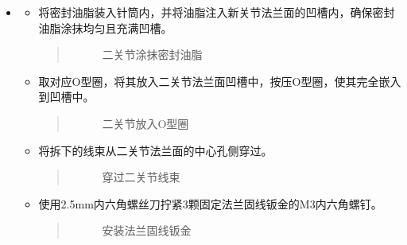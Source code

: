 \documentclass[a4paper,11pt,english,openany,oneside]{sphinxmanual}
\begin{document}
\begin{itemize}
\item {} 
\sphinxAtStartPar
{}
\begin{itemize}
\item {} 
\sphinxAtStartPar
将密封油脂装入针筒内，并将油脂注入新关节法兰面的凹槽内，确保密封油脂涂抹均匀且充满凹槽。
\begin{quote}

\begin{figure}[H]
\centering
\capstart

\noindent{}
\caption{二关节涂抹密封油脂}\label{\detokenize{_u66f4_u6362_u5173_u8282:id43}}\end{figure}
\end{quote}

\item {} 
\sphinxAtStartPar
取对应O型圈，将其放入二关节法兰面凹槽中，按压O型圈，使其完全嵌入到凹槽中。
\begin{quote}

\begin{figure}[H]
\centering
\capstart

\noindent{}
\caption{二关节放入O型圈}\label{\detokenize{_u66f4_u6362_u5173_u8282:id44}}\end{figure}
\end{quote}

\item {} 
\sphinxAtStartPar
将拆下的线束从二关节法兰面的中心孔侧穿过。
\begin{quote}

\begin{figure}[H]
\centering
\capstart

\noindent{}
\caption{穿过二关节线束}\label{\detokenize{_u66f4_u6362_u5173_u8282:id45}}\end{figure}
\end{quote}

\item {} 
\sphinxAtStartPar
使用2.5mm内六角螺丝刀拧紧3颗固定法兰固线钣金的M3内六角螺钉。
\begin{quote}

\begin{figure}[H]
\centering
\capstart

\noindent{}
\caption{安装法兰固线钣金}\label{\detokenize{_u66f4_u6362_u5173_u8282:id46}}\end{figure}
\end{quote}


\end{itemize}
\end{itemize}
\end{document}
